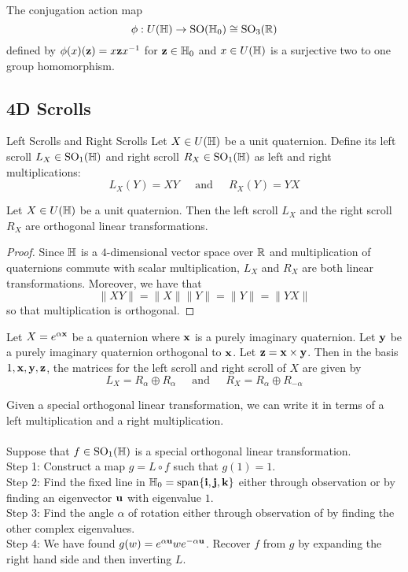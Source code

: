 \documentclass[a4paper]{article}
\begin{document}
\begin{thm}{}{} The conjugation action map $$\phi:U(\mathbb{H})\to\text{SO}(\mathbb{H}_0)\cong\text{SO}_3(\mathbb{R})$$ defined by $\phi(x)(\vb{z})=x\vb{z}x^{-1}$ for $\vb{z}\in\mathbb{H}_0$ and $x\in U(\mathbb{H})$ is a surjective two to one group homomorphism. 
\end{thm}

\subsection{4D Scrolls}
\begin{defn}{Left Scrolls and Right Scrolls}{} Let $X\in U(\mathbb{H})$ be a unit quaternion. Define its left scroll $L_X\in\text{SO}_1(\mathbb{H})$ and right scroll $R_X\in\text{SO}_1(\mathbb{H})$ as left and right multiplications: $$L_X(Y)=XY\;\;\;\;\text{ and }\;\;\;\; R_X(Y)=YX$$
\end{defn}

\begin{lmm}{}{} Let $X\in U(\mathbb{H})$ be a unit quaternion. Then the left scroll $L_X$ and the right scroll $R_X$ are orthogonal linear transformations. \tcbline
\begin{proof}
Since $\mathbb{H}$ is a $4$-dimensional vector space over $\mathbb{R}$ and multiplication of quaternions commute with scalar multiplication, $L_X$ and $R_X$ are both linear transformations. Moreover, we have that $$\|XY\|=\|X\|\|Y\|=\|Y\|=\|YX\|$$ so that multiplication is orthogonal. 
\end{proof}
\end{lmm}

\begin{lmm}{}{} Let $X=e^{\alpha\vb{x}}$ be a quaternion where $\vb{x}$ is a purely imaginary quaternion. Let $\vb{y}$ be a purely imaginary quaternion orthogonal to $\vb{x}$. Let $\vb{z}=\vb{x}\times\vb{y}$. Then in the basis $1,\vb{x},\vb{y},\vb{z}$, the matrices for the left scroll and right scroll of $X$ are given by $$L_X=R_\alpha\oplus R_\alpha\;\;\;\;\text{ and }\;\;\;\; R_X=R_\alpha\oplus R_{-\alpha}$$
\end{lmm}

Given a special orthogonal linear transformation, we can write it in terms of a left multiplication and a right multiplication. \\~\\

Suppose that $f\in\text{SO}_1(\mathbb{H})$ is a special orthogonal linear transformation. \\
Step 1: Construct a map $g=L\circ f$ such that $g(1)=1$. \\
Step 2: Find the fixed line in $\mathbb{H}_0=\text{span}\{\vb{i},\vb{j},\vb{k}\}$ either through observation or by finding an eigenvector $\vb{u}$ with eigenvalue $1$. \\
Step 3: Find the angle $\alpha$ of rotation either through observation of by finding the other complex eigenvalues. \\
Step 4: We have found $g(w)=e^{\alpha\vb{u}}we^{-\alpha\vb{u}}$. Recover $f$ from $g$ by expanding the right hand side and then inverting $L$. 
\end{document}
